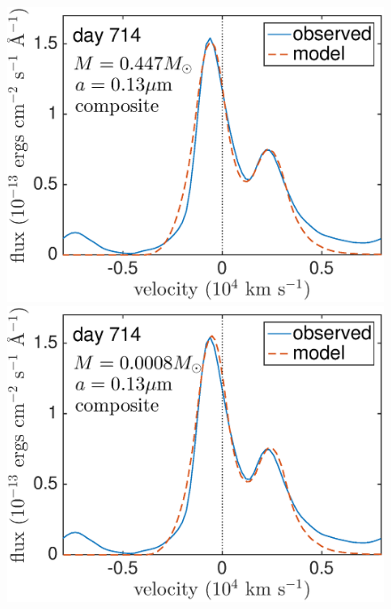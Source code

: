 \begin{figure}
\centering
\includegraphics[trim =-20 30 50 0,clip=true,scale=0.33]{chapters/chapter5/images/silicates_take2/OI/composit_Dwek2.eps}
\hspace{3mm}
\includegraphics[trim =0 30 0 -25,clip=true,scale=0.33]{chapters/chapter5/images/silicates_take2/OI/composit_bestfit2.eps}


\end{figure}
